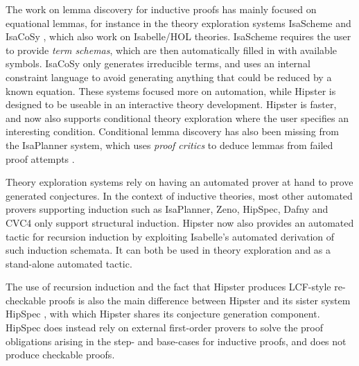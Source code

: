 \label{sec:related}

The work on lemma discovery for inductive proofs has mainly focused on equational lemmas, for instance in the theory exploration systems IsaScheme and IsaCoSy \cite{isascheme,isacosy}, which also work on Isabelle/HOL theories.
%
IsaScheme requires the user to provide \emph{term schemas}, which are then automatically filled in with available symbols.
%
IsaCoSy only generates irreducible terms, and uses an internal constraint language to avoid generating anything that could be reduced by a known equation.
%
These systems focused more on automation, while Hipster is designed to be useable in an interactive theory development.
%
Hipster is faster, and now also supports conditional theory exploration where the user specifies an interesting condition.
%
Conditional lemma discovery has also been missing from the IsaPlanner system, which uses \emph{proof critics} to deduce lemmas from failed proof attempts \cite{isaplanner2,IsaPcase}. 

Theory exploration systems rely on having an automated prover at hand to prove generated conjectures.
%
In the context of inductive theories, most other automated provers supporting induction such as IsaPlanner, Zeno, HipSpec, Dafny and CVC4 \cite{isaplanner2, zeno, hipspecCADE, dafny, cvc4} only support structural induction.
%
Hipster now also provides an automated tactic for recursion induction by exploiting Isabelle's automated derivation of such induction schemata.
%
It can both be used in theory exploration and as a stand-alone automated tactic.

The use of recursion induction and the fact that Hipster produces LCF-style re-checkable proofs is also the main difference between Hipster and its sister system HipSpec \cite{hipspecCADE}, with which Hipster shares its conjecture generation component.
%
HipSpec does instead rely on external first-order provers to solve the proof obligations arising in the step- and base-cases for inductive proofs, and does not produce checkable proofs.
